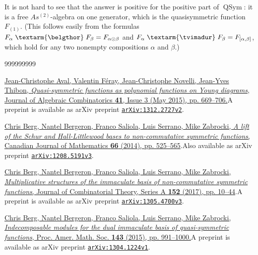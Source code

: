\documentclass
[numbers=enddot,12pt,final,onecolumn,notitlepage,abstracton]{scrartcl}%
\theoremstyle{definition}
\newcommand{\tvi}{\left. \textarm{\tvimadur} \right.}
\newcommand{\bel}{\left. \textarm{\belgthor} \right.}
\begin{document}
It is not hard to see that the answer is positive for the positive part of
$\operatorname*{QSym}$: it is a free $As^{\left(  2\right)  }$-algebra on one
generator, which is the quasisymmetric function $F_{\left(  1\right)  }$.
(This follows easily from the formulas $F_{\alpha} \bel F_{\beta}%
=F_{\alpha\odot\beta}$ and $F_{\alpha} \tvi F_{\beta}=F_{\left[  \alpha
,\beta\right]  }$, which hold for any two nonempty compositions $\alpha$ and
$\beta$.)

\begin{thebibliography}{999999999}                                                                                        %


%
\href{https://doi.org/10.1007/s10801-014-0549-y}{Jean-Christophe Aval,
Valentin F\'{e}ray, Jean-Christophe Novelli, Jean-Yves Thibon,
\textit{Quasi-symmetric functions as polynomial functions on Young diagrams},
Journal of Algebraic Combinatorics \textbf{41}, Issue 3 (May 2015), pp.
669--706.}\newline A preprint is available as arXiv preprint
\texttt{\href{https://arxiv.org/abs/1312.2727v2}{arXiv:1312.2727v2}}.

\href{https://doi.org/10.4153/CJM-2013-013-0}{Chris
Berg, Nantel Bergeron, Franco Saliola, Luis Serrano, Mike Zabrocki, \textit{A
lift of the Schur and Hall-Littlewood bases to non-commutative symmetric
functions}, Canadian Journal of Mathematics \textbf{66} (2014), pp.
525--565}.\newline Also available as arXiv preprint
\texttt{\href{https://arxiv.org/abs/1208.5191v3}{arXiv:1208.5191v3}}.

%
\href{https://doi.org/10.1016/j.jcta.2017.05.003}{Chris Berg, Nantel Bergeron,
Franco Saliola, Luis Serrano, Mike Zabrocki, \textit{Multiplicative structures
of the immaculate basis of non-commutative symmetric functions}, Journal of
Combinatorial Theory, Series A \textbf{152} (2017), pp. 10--44}.\newline A
preprint is available as arXiv preprint
\texttt{\href{https://arxiv.org/abs/1305.4700v3}{arXiv:1305.4700v3}}.

%
\href{https://doi.org/10.1090/S0002-9939-2014-12298-2}{Chris Berg, Nantel
Bergeron, Franco Saliola, Luis Serrano, Mike Zabrocki, \textit{Indecomposable
modules for the dual immaculate basis of quasi-symmetric functions}, Proc.
Amer. Math. Soc. \textbf{143} (2015), pp. 991--1000.}\newline A preprint is
available as arXiv preprint
\texttt{\href{https://arxiv.org/abs/1304.1224v1}{arXiv:1304.1224v1}}.


\end{thebibliography}
\end{document}
